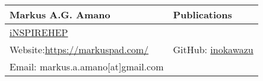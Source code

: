 \documentclass[fontsize=12pt]{article}
\begin{document}
\begin{center}
  \begin{tabularx}{\textwidth} { 
      >{\raggedright\arraybackslash}X 
    >{\raggedleft\arraybackslash}X  }
    \huge Markus A.G. Amano & Publications\\
    \hline
    \href{https://inspirehep.net/authors/1778034}{iNSPIREHEP} & \\
    Website:\url{https://markuspad.com/}& 
    GitHub: \href{https://github.com/inokawazu}{inokawazu}\\
    Email: markus.a.amano[at]gmail.com & \\
  \end{tabularx}
\end{center}



\end{document}
